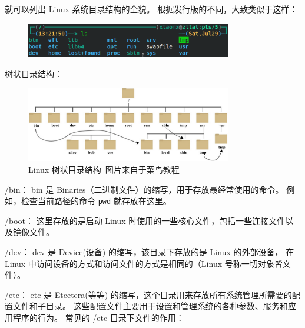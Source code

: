 \documentclass{ctexart}
\begin{document}
    就可以列出 Linux 系统目录结构的全貌。
    根据发行版的不同，大致类似于这样：

    \begin{figure}[htbp]
        \centering
        \includegraphics[width=0.80\textwidth]{images/directory/1.png}
    \end{figure}

    树状目录结构：

    \begin{figure}[htbp]
        \centering
        \includegraphics[width=0.80\textwidth]{images/directory/2.png}
        \caption{Linux 树状目录结构\ {}图片来自于菜鸟教程}
    \end{figure}

    /bin：
    bin 是 Binaries（二进制文件）的缩写，用于存放最经常使用的命令。
    例如，检查当前路径的命令 \texttt{pwd} 就存放在这里。

    /boot：
    这里存放的是启动 Linux 时使用的一些核心文件，包括一些连接文件以及镜像文件。

    /dev：
    dev 是 Device(设备) 的缩写，该目录下存放的是 Linux 的外部设备，
    在 Linux 中访问设备的方式和访问文件的方式是相同的（Linux 号称一切对象皆文件）。

    /etc：
    etc 是 Etcetera(等等) 的缩写，这个目录用来存放所有系统管理所需要的配置文件和子目录。
    这些配置文件主要用于设置和管理系统的各种参数、服务和应用程序的行为。
    常见的 /etc 目录下文件的作用：
    
\end{document}
